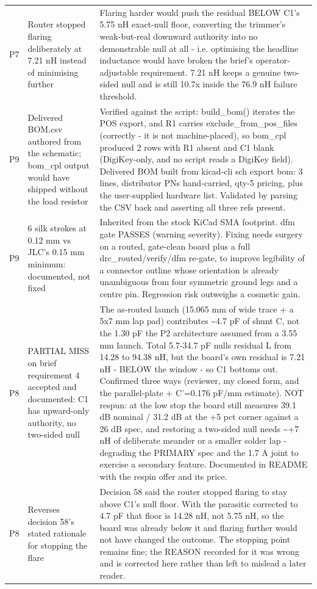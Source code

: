 \documentclass[11pt,a4paper]{article}
\begin{document}
{\begin{longtable}{lp{5.2cm}p{7.2cm}}
P7 & Router stopped flaring deliberately at 7.21 nH instead of minimising further & Flaring harder would push the residual BELOW C1's 5.75 nH exact-null floor, converting the trimmer's weak-but-real downward authority into no demonstrable null at all - i.e. optimising the headline inductance would have broken the brief's operator-adjustable requirement. 7.21 nH keeps a genuine two-sided null and is still 10.7x inside the 76.9 nH failure threshold. \\
P9 & Delivered BOM.csv authored from the schematic; bom\_cpl output would have shipped without the load resistor & Verified against the script: build\_bom() iterates the POS export, and R1 carries exclude\_from\_pos\_files (correctly - it is not machine-placed), so bom\_cpl produced 2 rows with R1 absent and C1 blank (DigiKey-only, and no script reads a DigiKey field). Delivered BOM built from kicad-cli sch export bom: 3 lines, distributor PNs hand-carried, qty-5 pricing, plus the user-supplied hardware list. Validated by parsing the CSV back and asserting all three refs present. \\
P9 & 6 silk strokes at 0.12 mm vs JLC's 0.15 mm minimum: documented, not fixed & Inherited from the stock KiCad SMA footprint. dfm gate PASSES (warning severity). Fixing needs surgery on a routed, gate-clean board plus a full drc\_routed/verify/dfm re-gate, to improve legibility of a connector outline whose orientation is already unambiguous from four symmetric ground legs and a centre pin. Regression risk outweighs a cosmetic gain. \\
P8 & PARTIAL MISS on brief requirement 4 accepted and documented: C1 has upward-only authority, no two-sided null & The as-routed launch (15.065 mm of wide trace + a 5x7 mm lap pad) contributes \textasciitilde{}4.7 pF of shunt C, not the 1.30 pF the P2 architecture assumed from a 3.55 mm launch. Total 5.7-34.7 pF nulls residual L from 14.28 to 94.38 nH, but the board's own residual is 7.21 nH - BELOW the window - so C1 bottoms out. Confirmed three ways (reviewer, my closed form, and the parallel-plate + C'=0.176 pF/mm estimate). NOT respun: at the low stop the board still measures 39.1 dB nominal / 31.2 dB at the +5 pct corner against a 26 dB spec, and restoring a two-sided null needs \textasciitilde{}+7 nH of deliberate meander or a smaller solder lap - degrading the PRIMARY spec and the 1.7 A joint to exercise a secondary feature. Documented in README with the respin offer and its price. \\
P8 & Reverses decision 58's stated rationale for stopping the flare & Decision 58 said the router stopped flaring to stay above C1's null floor. With the parasitic corrected to 4.7 pF that floor is 14.28 nH, not 5.75 nH, so the board was already below it and flaring further would not have changed the outcome. The stopping point remains fine; the REASON recorded for it was wrong and is corrected here rather than left to mislead a later reader. \\

\end{longtable}}
\end{document}
